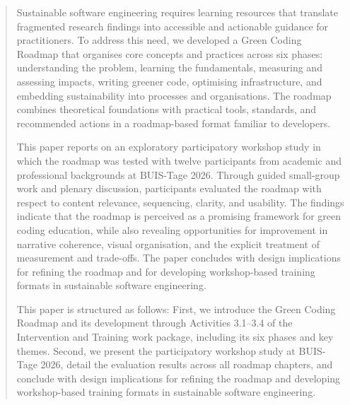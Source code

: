 \documentclass[english]{lni}
\begin{document}
\begin{abstract}

Sustainable software engineering requires learning resources that translate fragmented research findings into accessible and actionable guidance for practitioners. To address this need, we developed a Green Coding Roadmap that organises core concepts and practices across six phases: understanding the problem, learning the fundamentals, measuring and assessing impacts, writing greener code, optimising infrastructure, and embedding sustainability into processes and organisations. The roadmap combines theoretical foundations with practical tools, standards, and recommended actions in a roadmap-based format familiar to developers.

This paper reports on an exploratory participatory workshop study in which the roadmap was tested with twelve participants from academic and professional backgrounds at BUIS-Tage 2026. Through guided small-group work and plenary discussion, participants evaluated the roadmap with respect to content relevance, sequencing, clarity, and usability. The findings indicate that the roadmap is perceived as a promising framework for green coding education, while also revealing opportunities for improvement in narrative coherence, visual organisation, and the explicit treatment of measurement and trade-offs. The paper concludes with design implications for refining the roadmap and for developing workshop-based training formats in sustainable software engineering.

This paper is structured as follows: First, we introduce the Green Coding Roadmap and its development through Activities 3.1–3.4 of the Intervention and Training work package, including its six phases and key themes. Second, we present the participatory workshop study at BUIS-Tage 2026, detail the evaluation results across all roadmap chapters, and conclude with design implications for refining the roadmap and developing workshop-based training formats in sustainable software engineering.


\end{abstract}

\end{document}
